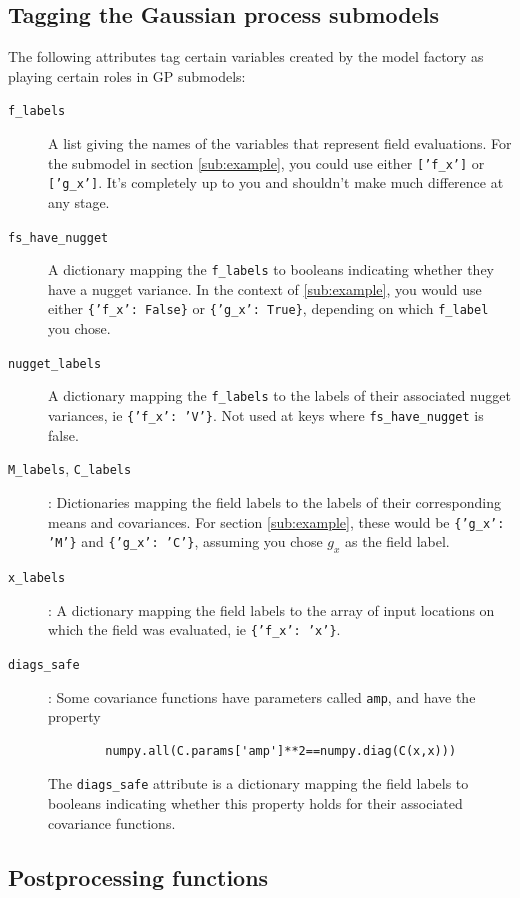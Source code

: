 \subsection{Tagging the Gaussian process submodels}
\label{sub:variable-tags} 
The following attributes tag certain variables created by the model factory as playing certain roles in GP submodels:
\begin{description}
    \item[\texttt{f\_labels}] A list giving the names of the variables that represent field evaluations. For the submodel in section \ref{sub:example}, you could use either \texttt{['f\_x']} or \texttt{['g\_x']}. It's completely up to you and shouldn't make much difference at any stage.
    \item[\texttt{fs\_have\_nugget}] A dictionary mapping the \texttt{f\_labels} to booleans indicating whether they have a nugget variance. In the context of \ref{sub:example}, you would use either \texttt{\{'f\_x': False\}} or \texttt{\{'g\_x': True\}}, depending on which \texttt{f\_label} you chose.
    \item[\texttt{nugget\_labels}] A dictionary mapping the \texttt{f\_labels} to the labels of their associated nugget variances, ie \texttt{\{'f\_x': 'V'\}}. Not used at keys where \texttt{fs\_have\_nugget} is false.
    \item[\texttt{M\_labels}, \texttt{C\_labels}]: Dictionaries mapping the field labels to the labels of their corresponding means and covariances. For section \ref{sub:example}, these would be \texttt{\{'g\_x': 'M'\}} and \texttt{\{'g\_x': 'C'\}}, assuming you chose $g_x$ as the field label.
    \item[\texttt{x\_labels}]: A dictionary mapping the field labels to the array of input locations on which the field was evaluated, ie \texttt{\{'f\_x': 'x'\}}.
    \item[\texttt{diags\_safe}]: Some covariance functions have parameters called \texttt{amp}, and have the property
    \begin{verbatim}
        numpy.all(C.params['amp']**2==numpy.diag(C(x,x)))
    \end{verbatim}
The \texttt{diags\_safe} attribute is a dictionary mapping the field labels to booleans indicating whether this property holds for their associated covariance functions.
\end{description}

\subsection{Postprocessing functions}


